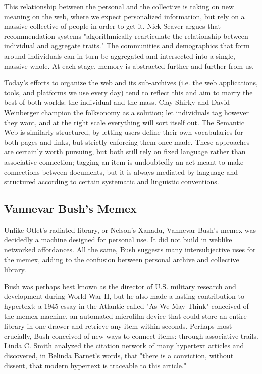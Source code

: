 This relationship between the personal and the collective is taking on new meaning on the web, where we expect personalized information, but rely on a massive collective of people in order to get it. Nick Seaver argues that recommendation systems "algorithmically rearticulate the relationship between individual and aggregate traits."  The communities and demographics that form around individuals can in turn be aggregated and intersected into a single, massive whole. At each stage, memory is abstracted further and further from us.

Today's efforts to organize the web and its sub-archives (i.e. the web applications, tools, and platforms we use every day) tend to reflect this and aim to marry the best of both worlds: the individual and the mass. Clay Shirky and David Weinberger champion the folksonomy as a solution; let individuals tag however they want, and at the right scale everything will sort itself out.  The Semantic Web is similarly structured, by letting users define their own vocabularies for both pages and links, but strictly enforcing them once made.  These approaches are certainly worth pursuing, but both still rely on fixed language rather than associative connection; tagging an item is undoubtedly an act meant to make connections between documents, but it is always mediated by language and structured according to certain systematic and linguistic conventions.

\subsection{Vannevar Bush's Memex}

Unlike Otlet's radiated library, or Nelson's Xanadu, Vannevar Bush's memex was decidedly a machine designed for personal use. It did not build in weblike networked affordances. All the same, Bush suggests many intersubjective uses for the memex, adding to the confusion between personal archive and collective library.

Bush was perhaps best known as the director of U.S. military research and development during World War II, but he also made a lasting contribution to hypertext; a 1945 essay in the Atlantic called "As We May Think" conceived of the memex machine, an automated microfilm device that could store an entire library in one drawer and retrieve any item within seconds.  Perhaps most crucially, Bush conceived of new ways to connect items: through associative trails. Linda C. Smith analyzed the citation network of many hypertext articles and discovered, in Belinda Barnet's words, that "there is a conviction, without dissent, that modern hypertext is traceable to this article." 

